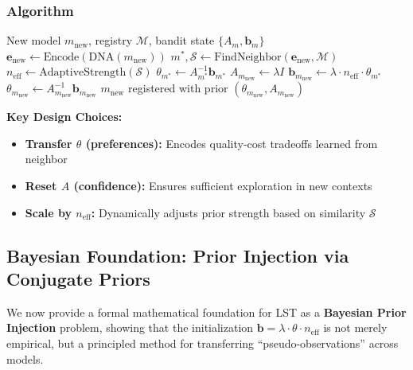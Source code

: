 \documentclass[sigconf,nonacm]{acmart}
\begin{document}
\subsubsection{Algorithm}

\begin{algorithm}[h]
\caption{Latent Semantic Transfer}
\begin{algorithmic}[1]
\REQUIRE New model $m_{\text{new}}$, registry $\mathcal{M}$, bandit state $\{A_m, \mathbf{b}_m\}$
\STATE $\mathbf{e}_{\text{new}} \leftarrow \text{Encode}(\text{DNA}(m_{\text{new}}))$
\STATE $m^*, \mathcal{S} \leftarrow \text{FindNeighbor}(\mathbf{e}_{\text{new}}, \mathcal{M})$
\STATE $n_{\text{eff}} \leftarrow \text{AdaptiveStrength}(\mathcal{S})$
\STATE $\theta_{m^*} \leftarrow A_{m^*}^{-1} \mathbf{b}_{m^*}$ 
\STATE $A_{m_{\text{new}}} \leftarrow \lambda I$ 
\STATE $\mathbf{b}_{m_{\text{new}}} \leftarrow \lambda \cdot n_{\text{eff}} \cdot \theta_{m^*}$ 
\STATE $\theta_{m_{\text{new}}} \leftarrow A_{m_{\text{new}}}^{-1} \mathbf{b}_{m_{\text{new}}}$
\RETURN $m_{\text{new}}$ registered with prior $(\theta_{m_{\text{new}}}, A_{m_{\text{new}}})$
\end{algorithmic}
\end{algorithm}

\textbf{Key Design Choices:}
\begin{itemize}
    \item \textbf{Transfer $\theta$ (preferences):} Encodes quality-cost tradeoffs learned from neighbor
    \item \textbf{Reset $A$ (confidence):} Ensures sufficient exploration in new contexts
    \item \textbf{Scale by $n_{\text{eff}}$:} Dynamically adjusts prior strength based on similarity $\mathcal{S}$
\end{itemize}

\subsection{Bayesian Foundation: Prior Injection via Conjugate Priors}

We now provide a formal mathematical foundation for LST as a \textbf{Bayesian Prior Injection} problem, showing that the initialization $\mathbf{b} = \lambda \cdot \theta \cdot n_{\text{eff}}$ is not merely empirical, but a principled method for transferring ``pseudo-observations'' across models.
\end{document}
